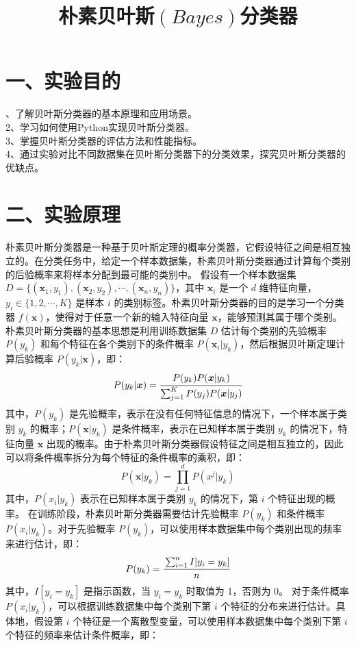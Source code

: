 \documentclass{article}
\begin{document}
\title{\Huge \centering \textbf{朴素贝叶斯$(Bayes)$分类器}}
\date{}
\maketitle
\section*{\LARGE 一、实验目的}、了解贝叶斯分类器的基本原理和应用场景。\\
2、学习如何使用Python实现贝叶斯分类器。\\
3、掌握贝叶斯分类器的评估方法和性能指标。\\
4、通过实验对比不同数据集在贝叶斯分类器下的分类效果，探究贝叶斯分类器的优缺点。

\section*{\LARGE 二、实验原理}
朴素贝叶斯分类器是一种基于贝叶斯定理的概率分类器，它假设特征之间是相互独立的。在分类任务中，给定一个样本数据集，朴素贝叶斯分类器通过计算每个类别的后验概率来将样本分配到最可能的类别中。
假设有一个样本数据集 $D=\{(\boldsymbol{x}_1,y_1),(\boldsymbol{x}_2,y_2),\cdots,(\boldsymbol{x}_n,y_n)\}$，其中 $\boldsymbol{x}_i$ 是一个 $d$ 维特征向量，$y_i \in \{1,2,\cdots,K\}$ 是样本 $i$ 的类别标签。朴素贝叶斯分类器的目的是学习一个分类器 $f(\boldsymbol{x})$，使得对于任意一个新的输入特征向量 $\boldsymbol{x}$，能够预测其属于哪个类别。
朴素贝叶斯分类器的基本思想是利用训练数据集 $D$ 估计每个类别的先验概率 $P(y_k)$ 和每个特征在各个类别下的条件概率 $P(\boldsymbol{x}_i|y_k)$，然后根据贝叶斯定理计算后验概率 $P(y_k|\boldsymbol{x})$，即：
$$P(y_k|\boldsymbol{x})=\cfrac{P(y_k)P(\boldsymbol{x}|y_k)}{\sum_{j=1}^K P(y_j)P(\boldsymbol{x}|y_j)}$$
其中，$P(y_k)$ 是先验概率，表示在没有任何特征信息的情况下，一个样本属于类别 $y_k$ 的概率；$P(\boldsymbol{x}|y_k)$ 是条件概率，表示在已知样本属于类别 $y_k$ 的情况下，特征向量 $\boldsymbol{x}$ 出现的概率。由于朴素贝叶斯分类器假设特征之间是相互独立的，因此可以将条件概率拆分为每个特征的条件概率的乘积，即：
$$P(\boldsymbol{x}|y_k)=\prod_{j=1}^d P(x^j|y_k)$$
其中，$P(x_i|y_k)$ 表示在已知样本属于类别 $y_k$ 的情况下，第 $i$ 个特征出现的概率。
在训练阶段，朴素贝叶斯分类器需要估计先验概率 $P(y_k)$ 和条件概率 $P(x_i|y_k)$。对于先验概率 $P(y_k)$，可以使用样本数据集中每个类别出现的频率来进行估计，即：
$$P(y_k)=\cfrac{\sum_{i=1}^n I[y_i=y_k]}{n}$$
其中，$I[y_i=y_k]$ 是指示函数，当 $y_i=y_k$ 时取值为 1，否则为 0。
对于条件概率 $P(x_i|y_k)$，可以根据训练数据集中每个类别下第 $i$ 个特征的分布来进行估计。具体地，假设第 $i$ 个特征是一个离散型变量，可以使用样本数据集中每个类别下第 $i$ 个特征的频率来估计条件概率，即：
\end{document}
